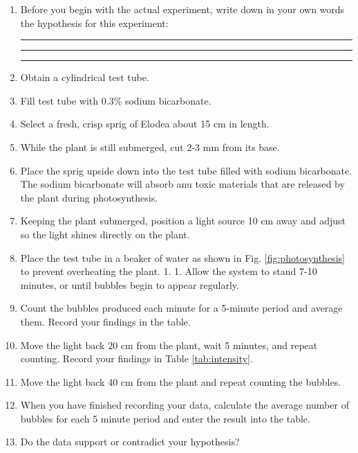 \begin{enumerate}
\def\labelenumi{\arabic{enumi}.}
\item
  Before you begin with the actual experiment, write down in your own
  words the hypothesis for this experiment:

  \begin{center}\rule{0.5\linewidth}{\linethickness}\end{center}

  \begin{center}\rule{0.5\linewidth}{\linethickness}\end{center}

  \begin{center}\rule{0.5\linewidth}{\linethickness}\end{center}
\item
  Obtain a cylindrical test tube.
\item
  Fill test tube with 0.3\% sodium bicarbonate.
\item
  Select a fresh, crisp sprig of Elodea about 15 cm in length.
\item
  While the plant is still submerged, cut 2-3 mm from its base.
\item
  Place the sprig upside down into the test tube filled with sodium
  bicarbonate. The sodium bicarbonate will absorb anu toxic materials
  that are released by the plant during photosynthesis.
\item
  Keeping the plant submerged, position a light source 10 cm away and
  adjust so the light shines directly on the plant.
\item
  Place the test tube in a beaker of water as shown in Fig.
  \ref{fig:photosynthesis} to prevent overheating the plant. 1. 1. Allow
  the system to stand 7-10 minutes, or until bubbles begin to appear
  regularly.
\item
  Count the bubbles produced each minute for a 5-minute period and
  average them. Record your findings in the table.
\item
  Move the light back 20 cm from the plant, wait 5 minutes, and repeat
  counting. Record your findings in Table \ref{tab:intensity}.
\item
  Move the light back 40 cm from the plant and repeat counting the
  bubbles.
\item
  When you have finished recording your data, calculate the average
  number of bubbles for each 5 minute period and enter the result into
  the table.
\item
  Do the data support or contradict your hypothesis?
\end{enumerate}

